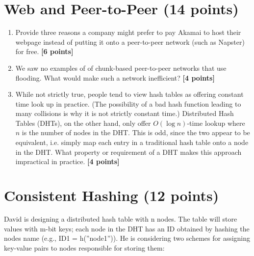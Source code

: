 \documentclass{article}
\begin{document}

\section{Web and Peer-to-Peer (14 points)}
\begin{enumerate}
\item{Provide three reasons a company might prefer to pay Akamai to host their
webpage instead of putting it onto a peer-to-peer network (such as Napster) for
free. \textbf{[6 points]}}

\item{We saw no examples of of chunk-based peer-to-peer networks that use
flooding. What would make such a network inefficient? \textbf{[4 points]}}

\item{While not strictly true, people tend to view hash tables as offering
constant time look up in practice. (The possibility of a bad hash function
leading to many collisions is why it is not strictly constant time.)
Distributed Hash Tables (DHTs), on the other hand, only offer $O(\log n)$-time
lookup where $n$ is the number of nodes in the DHT.  This is odd, since the two
appear to be equivalent, i.e. simply map each entry in a traditional hash table
onto a node in the DHT.  What property or requirement of a DHT makes this
approach impractical in practice. \textbf{[4 points]}}

\end{enumerate}


\section{Consistent Hashing (12 points)}
David is designing a distributed hash table with n nodes. The table will store
values with m-bit keys; each node in the DHT has an ID obtained by hashing the
nodes name (e.g., ID1 = h(”node1”)). He is considering two schemes for
assigning key-value pairs to nodes responsible for storing them:
\end{document}
